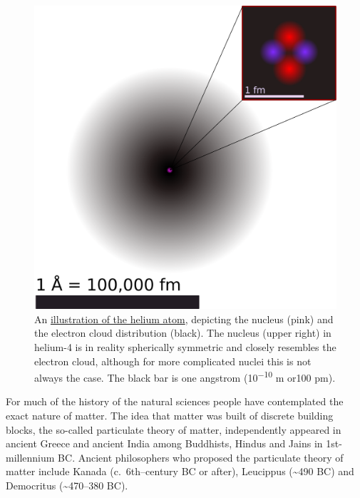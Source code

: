 \begin{figure}

{\centering \includegraphics[width=0.7\linewidth]{./figures/chemistry/Helium_atom_QM} 

}

\caption{An \href{https://commons.wikimedia.org/wiki/File:Helium_atom_QM.svg}{illustration of the helium atom}, depicting the nucleus (pink) and the electron cloud distribution (black). The nucleus (upper right) in helium-4 is in reality spherically symmetric and closely resembles the electron cloud, although for more complicated nuclei this is not always the case. The black bar is one angstrom (10\textsuperscript{−10} m or100 pm).}\label{fig:atomcartoon}
\end{figure}

For much of the history of the natural sciences people have contemplated
the exact nature of matter. The idea that matter was built of discrete
building blocks, the so-called particulate theory of matter,
independently appeared in ancient Greece and ancient India among
Buddhists, Hindus and Jains in 1st-millennium BC. Ancient philosophers
who proposed the particulate theory of matter include Kanada
(c.~6th--century BC or after), Leucippus (\textasciitilde490 BC) and
Democritus (\textasciitilde470--380 BC).

